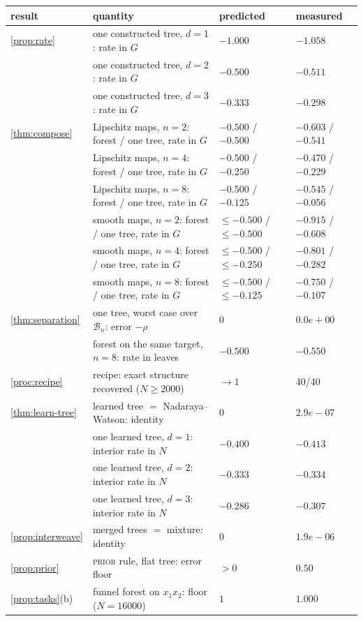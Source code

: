 \begin{tabular}{@{}llp{2.4cm}p{3.0cm}@{}}\toprule
result & quantity & predicted & measured\\\midrule
\cref{prop:rate} & one constructed tree, $d=1$: rate in $G$ & $-1.000$ & $-1.058$\\
 & one constructed tree, $d=2$: rate in $G$ & $-0.500$ & $-0.511$\\
 & one constructed tree, $d=3$: rate in $G$ & $-0.333$ & $-0.298$\\
\cref{thm:compose} & Lipschitz maps, $n=2$: forest / one tree, rate in $G$ & $-0.500$ / $-0.500$ & $-0.603$ / $-0.541$\\
 & Lipschitz maps, $n=4$: forest / one tree, rate in $G$ & $-0.500$ / $-0.250$ & $-0.470$ / $-0.229$\\
 & Lipschitz maps, $n=8$: forest / one tree, rate in $G$ & $-0.500$ / $-0.125$ & $-0.545$ / $-0.056$\\
 & smooth maps, $n=2$: forest / one tree, rate in $G$ & $\le-0.500$ / $\le-0.500$ & $-0.915$ / $-0.608$\\
 & smooth maps, $n=4$: forest / one tree, rate in $G$ & $\le-0.500$ / $\le-0.250$ & $-0.801$ / $-0.282$\\
 & smooth maps, $n=8$: forest / one tree, rate in $G$ & $\le-0.500$ / $\le-0.125$ & $-0.750$ / $-0.107$\\
\cref{thm:separation} & one tree, worst case over $\mathcal B_n$: error $-\rho$ & $0$ & $0.0e+00$\\
 & forest on the same target, $n=8$: rate in leaves & $-0.500$ & $-0.550$\\
\cref{proc:recipe} & recipe: exact structure recovered ($N\ge2000$) & $\to1$ & 40/40\\
\cref{thm:learn-tree} & learned tree $=$ Nadaraya--Watson: identity & $0$ & $2.9e-07$\\
 & one learned tree, $d=1$: interior rate in $N$ & $-0.400$ & $-0.413$\\
 & one learned tree, $d=2$: interior rate in $N$ & $-0.333$ & $-0.334$\\
 & one learned tree, $d=3$: interior rate in $N$ & $-0.286$ & $-0.307$\\
\cref{prop:interweave} & merged trees $=$ mixture: identity & $0$ & $1.9e-06$\\
\cref{prop:prior} & \textsc{prior} rule, flat tree: error floor & $>0$ & $0.50$\\
\cref{prop:tasks}(b) & funnel forest on $x_1x_2$: floor ($N=16000$) & $1$ & $1.000$\\

\end{tabular}
